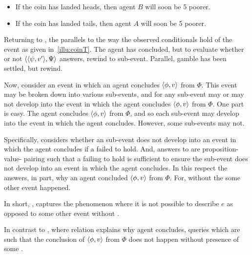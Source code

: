 \begin{note}
  \begin{itemize}[noitemsep]
  \item
    If the coin has landed heads, then agent \(B\) will soon be \texteuro{}5 poorer.
  \item
    If the coin has landed tails, then agent \(A\) will soon be \texteuro{}5 poorer.
  \end{itemize}
\end{note}

\begin{note}
  Returning to \qWhyV{}, the \itc{} parallels to the way the observed conditionals hold of the event as given in~\autoref{illu:coinT}.
  The agent has concluded, but to evaluate whether or not \(\langle \langle \psi, v' \rangle, \Psi \rangle\) answers, rewind to sub-event.
  Parallel, gamble has been settled, but rewind.

  Now, consider an event in which an agent concludes \(\langle \phi, v \rangle\) from \(\Phi\).
  This event may be broken down into various sub-events, and for any sub-event may or may not develop into the event in which the agent concludes \(\langle \phi, v \rangle\) from \(\Phi\).
  One part is easy.
  The agent concludes \(\langle \phi, v \rangle\) from \(\Phi\), and so each sub-event may develop into the event in which the agent concludes.
  However, some sub-events may not.

  Specifically, \qWhyV{} considers whether an sub-event does not develop into an event in which the agent concludes if a \ros{} failed to hold.
  And, answers to \qWhyV{} are proposition-value-\pool{} pairing such that a \ros{} failing to hold is sufficient to ensure the sub-event does not develop into an event in which the agent concludes.
  In this respect the \ros{} answers, in part, why an agent concluded \(\langle \phi, v \rangle\) from \(\Phi\).
  For, without the \ros{} some other event happened.
\end{note}

\begin{note}
  In short, \qWhyV{}, captures the phenomenon where it is not possible to describe \(e\) as opposed to some other event without \ros{}.

  In contrast to \qWhy{}, where relation explains why agent concludes, \qWhyV{} queries which  are such that the conclusion of \(\langle \phi, v \rangle\) from \(\Phi\) does not happen without presence of some .
\end{note}

\subsection*{}


